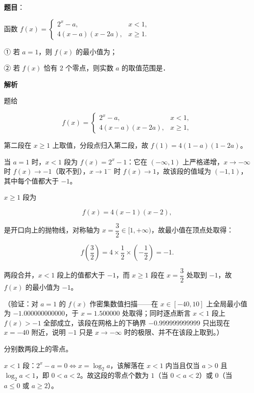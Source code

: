 \begin{answer}

\textbf{题目}：

函数 $f(x)=\begin{cases} 2^{x}-a, & x<1,\\ 4(x-a)(x-2a), & x\geqslant 1. \end{cases}$

① 若 \(a=1\)，则 \(f(x)\) 的最小值为\gkblank{}；

② 若 \(f(x)\) 恰有 \(2\) 个零点，则实数 \(a\) 的取值范围是\gkblank{}．

\textbf{解析}

题给

\nopagebreak[4]
\[
f(x)=\begin{cases}
2^{x}-a, & x<1,\\
4(x-a)(x-2a), & x\geqslant1,
\end{cases}
\]

第二段在 \(x\geqslant1\) 上取值，分段点归入第二段，故 \(f(1)=4(1-a)(1-2a)\)。


当 \(a=1\) 时，\(x<1\) 段为 \(f(x)=2^{x}-1\)：它在 \((-\infty,1)\) 上严格递增，\(x\to-\infty\) 时 \(f(x)\to-1\)（取不到），\(x\to1^{-}\) 时 \(f(x)\to1\)，故该段的值域为 \((-1,1)\)，其中每个值都大于 \(-1\)。

\(x\geqslant1\) 段为

\nopagebreak[4]
\[
f(x)=4(x-1)(x-2),
\]

是开口向上的抛物线，对称轴为 \(x=\dfrac{3}{2}\in[1,+\infty)\)，故最小值在顶点处取得：

\nopagebreak[4]
\[
f\left(\frac{3}{2}\right)=4\times\frac{1}{2}\times\left(-\frac{1}{2}\right)=-1.
\]

两段合并，\(x<1\) 段上的值都大于 \(-1\)，而 \(x\geqslant1\) 段在 \(x=\dfrac{3}{2}\) 处取到 \(-1\)，故 \(f(x)\) 的最小值为 \(-1\)。

（验证：对 \(a=1\) 的 \(f(x)\) 作密集数值扫描——在 \(x\in[-40,10]\) 上全局最小值为 \(-1.000000000000\)，于 \(x=1.500000\) 处取得；同时逐点断言 \(x<1\) 段上 \(f(x)>-1\) 全部成立，该段在网格上的下确界 \(-0.999999999999\) 只出现在 \(x=-40\) 附近，说明 \(-1\) 只是 \(x\to-\infty\) 时的极限、并不在该段上取到。）


分别数两段上的零点。

\(x<1\) 段：\(2^{x}-a=0\iff x=\log_{2}a\)，该解落在 \(x<1\) 内当且仅当 \(a>0\) 且 \(\log_{2}a<1\)，即 \(0<a<2\)。故这段的零点个数为 \(1\)（当 \(0<a<2\)）或 \(0\)（当 \(a\leqslant0\) 或 \(a\geqslant2\)）。


\end{answer}
